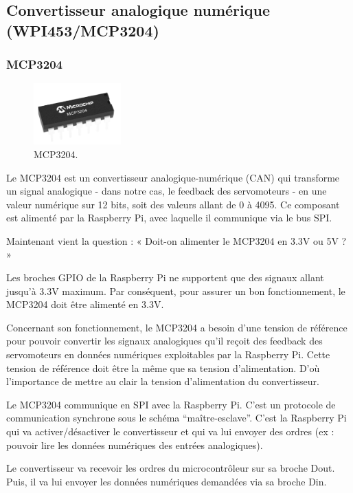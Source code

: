 \documentclass[a4paper,12pt]{report}  %
\begin{document}
\subsection{Convertisseur analogique numérique (WPI453/MCP3204)}

\subsubsection{MCP3204}
\begin{figure}[H]
	\centering
	\includegraphics[width=0.3\textwidth]{./attachments/MCP3204.png}
	\caption{MCP3204.}
\end{figure}

Le MCP3204 est un convertisseur analogique-numérique (CAN) qui transforme un signal analogique - dans notre cas, le feedback des servomoteurs - en une valeur numérique sur 12 bits, soit des valeurs allant de 0 à 4095. Ce composant est alimenté par la Raspberry Pi, avec laquelle il communique via le bus SPI. 

Maintenant vient la question : « Doit-on alimenter le MCP3204 en 3.3V ou 5V ? » 

Les broches GPIO de la Raspberry Pi ne supportent que des signaux allant jusqu’à 3.3V maximum. Par conséquent, pour assurer un bon fonctionnement, le MCP3204 doit être alimenté en 3.3V. 

Concernant son fonctionnement, le MCP3204 a besoin d’une tension de référence pour pouvoir convertir les signaux analogiques qu’il reçoit des feedback des servomoteurs en données numériques exploitables par la Raspberry Pi. Cette tension de référence doit être la même que sa tension d’alimentation. D’où l’importance de mettre au clair la tension d’alimentation du convertisseur.  

Le MCP3204 communique en SPI avec la Raspberry Pi. C’est un protocole de communication synchrone sous le schéma “maître-esclave”. C’est la Raspberry Pi qui va activer/désactiver le convertisseur et qui va lui envoyer des ordres (ex : pouvoir lire les données numériques des entrées analogiques). 

Le convertisseur va recevoir les ordres du microcontrôleur sur sa broche Dout. Puis, il va lui envoyer les données numériques demandées via sa broche Din. 
\end{document}
